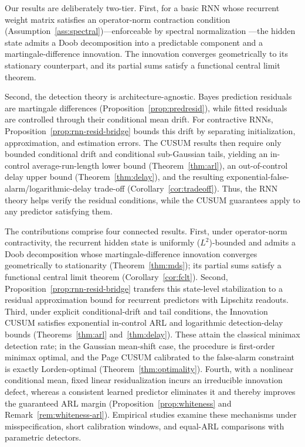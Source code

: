 \documentclass[bj,authoryear]{imsart}
\theoremstyle{plain}
\theoremstyle{definition}
\begin{document}
Our results are deliberately two-tier. First, for a basic RNN whose recurrent weight matrix satisfies an operator-norm contraction condition (Assumption~\ref{ass:spectral})—enforceable by spectral normalization \citep{miyato2018spectral}—the hidden state admits a Doob decomposition into a predictable component and a martingale-difference innovation. The innovation converges geometrically to its stationary counterpart, and its partial sums satisfy a functional central limit theorem.

Second, the detection theory is architecture-agnostic. Bayes prediction residuals are martingale differences (Proposition~\ref{prop:predresid}), while fitted residuals are controlled through their conditional mean drift. For contractive RNNs, Proposition~\ref{prop:rnn-resid-bridge} bounds this drift by separating initialization, approximation, and estimation errors. The CUSUM results then require only bounded conditional drift and conditional sub-Gaussian tails, yielding an in-control average-run-length lower bound (Theorem~\ref{thm:arl}), an out-of-control delay upper bound (Theorem~\ref{thm:delay}), and the resulting exponential-false-alarm/logarithmic-delay trade-off (Corollary~\ref{cor:tradeoff}). Thus, the RNN theory helps verify the residual conditions, while the CUSUM guarantees apply to any predictor satisfying them.

The contributions comprise four connected results. First, under operator-norm contractivity, the recurrent hidden state is uniformly ($L^2$)-bounded and admits a Doob decomposition whose martingale-difference innovation converges geometrically to stationarity (Theorem~\ref{thm:mds}); its partial sums satisfy a functional central limit theorem (Corollary~\ref{cor:fclt}). Second, Proposition~\ref{prop:rnn-resid-bridge} transfers this state-level stabilization to a residual approximation bound for recurrent predictors with Lipschitz readouts. Third, under explicit conditional-drift and tail conditions, the Innovation CUSUM satisfies exponential in-control ARL and logarithmic detection-delay bounds (Theorems~\ref{thm:arl} and~\ref{thm:delay}). These attain the classical minimax detection rate; in the Gaussian mean-shift case, the procedure is first-order minimax optimal, and the Page CUSUM calibrated to the false-alarm constraint is exactly Lorden-optimal (Theorem~\ref{thm:optimality}). Fourth, with a nonlinear conditional mean, fixed linear residualization incurs an irreducible innovation defect, whereas a consistent learned predictor eliminates it and thereby improves the guaranteed ARL margin (Proposition~\ref{prop:whiteness} and Remark~\ref{rem:whiteness-arl}). Empirical studies examine these mechanisms under misspecification, short calibration windows, and equal-ARL comparisons with parametric detectors.
\end{document}
